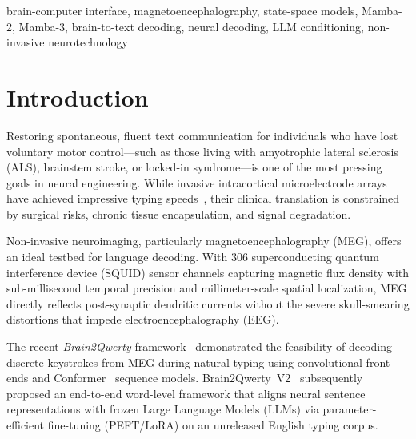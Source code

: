 \documentclass[conference]{IEEEtran}
\begin{document}
\begin{IEEEkeywords}
brain-computer interface, magnetoencephalography, state-space models, Mamba-2, Mamba-3, brain-to-text decoding, neural decoding, LLM conditioning, non-invasive neurotechnology
\end{IEEEkeywords}

\section{Introduction}
\label{sec:intro}

Restoring spontaneous, fluent text communication for individuals who have lost voluntary motor control---such as those living with amyotrophic lateral sclerosis (ALS), brainstem stroke, or locked-in syndrome---is one of the most pressing goals in neural engineering. While invasive intracortical microelectrode arrays have achieved impressive typing speeds~\cite{willett2021high}, their clinical translation is constrained by surgical risks, chronic tissue encapsulation, and signal degradation.

Non-invasive neuroimaging, particularly magnetoencephalography (MEG), offers an ideal testbed for language decoding. With 306 superconducting quantum interference device (SQUID) sensor channels capturing magnetic flux density with sub-millisecond temporal precision and millimeter-scale spatial localization, MEG directly reflects post-synaptic dendritic currents without the severe skull-smearing distortions that impede electroencephalography (EEG).

The recent \textit{Brain2Qwerty} framework~\cite{b2q_v1} demonstrated the feasibility of decoding discrete keystrokes from MEG during natural typing using convolutional front-ends and Conformer~\cite{conformer} sequence models. Brain2Qwerty~V2~\cite{b2q_v2} subsequently proposed an end-to-end word-level framework that aligns neural sentence representations with frozen Large Language Models (LLMs) via parameter-efficient fine-tuning (PEFT/LoRA) on an unreleased English typing corpus.
\end{document}

